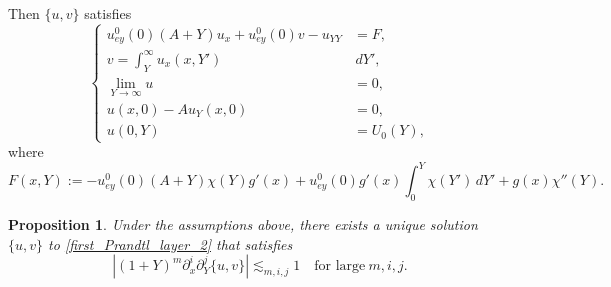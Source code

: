 \documentclass[reqno, 11pt]{amsart}
\theoremstyle{plain}
\newtheorem{proposition}[theorem]{Proposition}
\theoremstyle{definition}
\theoremstyle{remark}
\numberwithin{equation}{section}
\begin{document}
Then $\{u,v\}$ satisfies
\begin{equation}\label{first_Prandtl_layer_2}
\left\{\begin{aligned}
 u_{ey}^0(0) (A+Y) u_x + u_{ey}^0(0) v - u_{YY} &= F,\\
 v =  \int_Y^\infty u_x(x,Y')&\, dY',\\
\lim_{Y \to \infty} u  &= 0,\\
u(x,0) - A u_{Y}(x,0) &= 0,\\
u(0,Y) &= U_0(Y),
\end{aligned}\right.
\end{equation}
where
$$
F(x,Y):= -u_{ey}^0(0) (A+Y) \chi(Y) g'(x) + u_{ey}^0(0) g'(x) \int_0^Y \chi(Y')\, dY' + g(x) \chi''(Y).
$$
\begin{proposition}
Under the assumptions above, there exists a unique solution $\{u,v\}$ to \eqref{first_Prandtl_layer_2} that satisfies
\begin{equation}\label{est:Prandtl}
|(1+Y)^m \partial_x^i \partial_Y^j \{u,v\}| \lesssim_{m,i,j} 1 \quad \mbox{for large}~m,i,j.
\end{equation}
\end{proposition}
\end{document}
